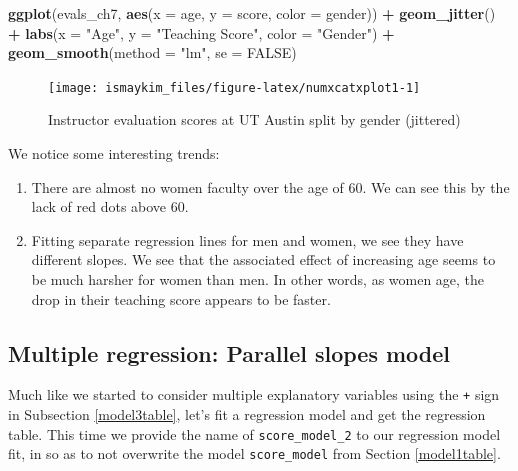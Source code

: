 \documentclass[12pt,]{krantz}
\makeatletter
\newenvironment{Shaded}{\begin{snugshade}}{\end{snugshade}}
\newcommand{\KeywordTok}[1]{\textcolor[rgb]{0.27,0.27,0.27}{\textbf{#1}}}
\newcommand{\DataTypeTok}[1]{\textcolor[rgb]{0.27,0.27,0.27}{#1}}
\newcommand{\StringTok}[1]{\textcolor[rgb]{0.5,0.5,0.5}{#1}}
\newcommand{\OtherTok}[1]{\textcolor[rgb]{0.37,0.37,0.37}{#1}}
\newcommand{\OperatorTok}[1]{\textcolor[rgb]{0.43,0.43,0.43}{\textbf{#1}}}
\newcommand{\NormalTok}[1]{#1}
\providecommand{\tightlist}{%
  \setlength{\itemsep}{0pt}\setlength{\parskip}{0pt}}
\newenvironment{kframe}{%
\medskip{}
\setlength{\fboxsep}{.8em}
 \def\at@end@of@kframe{}%
 \ifinner\ifhmode%
  \def\at@end@of@kframe{\end{minipage}}%
  \begin{minipage}{\columnwidth}%
 \fi\fi%
 \def\FrameCommand##1{\hskip\@totalleftmargin \hskip-\fboxsep
 \colorbox{shadecolor}{##1}\hskip-\fboxsep
     \hskip-\linewidth \hskip-\@totalleftmargin \hskip\columnwidth}%
 \MakeFramed {\advance\hsize-\width
   \@totalleftmargin\z@ \linewidth\hsize
   \@setminipage}}%
 {\par\unskip\endMakeFramed%
 \at@end@of@kframe}
\renewenvironment{Shaded}{\begin{kframe}}{\end{kframe}}
\theoremstyle{definition}
\theoremstyle{definition}
\theoremstyle{definition}
\theoremstyle{remark}
\makeatother
\begin{document}
\begin{Shaded}
\begin{Highlighting}[]
\KeywordTok{ggplot}\NormalTok{(evals_ch7, }\KeywordTok{aes}\NormalTok{(}\DataTypeTok{x =}\NormalTok{ age, }\DataTypeTok{y =}\NormalTok{ score, }\DataTypeTok{color =}\NormalTok{ gender)) }\OperatorTok{+}
\StringTok{  }\KeywordTok{geom_jitter}\NormalTok{() }\OperatorTok{+}
\StringTok{  }\KeywordTok{labs}\NormalTok{(}\DataTypeTok{x =} \StringTok{"Age"}\NormalTok{, }\DataTypeTok{y =} \StringTok{"Teaching Score"}\NormalTok{, }\DataTypeTok{color =} \StringTok{"Gender"}\NormalTok{) }\OperatorTok{+}
\StringTok{  }\KeywordTok{geom_smooth}\NormalTok{(}\DataTypeTok{method =} \StringTok{"lm"}\NormalTok{, }\DataTypeTok{se =} \OtherTok{FALSE}\NormalTok{)}
\end{Highlighting}
\end{Shaded}

\begin{figure}

{\centering \texttt{[image: ismaykim\_files/figure-latex/numxcatxplot1-1]} 

}

\caption{Instructor evaluation scores at UT Austin split by gender (jittered)}\label{fig:numxcatxplot1}
\end{figure}

We notice some interesting trends:

\begin{enumerate}
\def\labelenumi{\arabic{enumi}.}
\tightlist
\item
  There are almost no women faculty over the age of 60. We can see this
  by the lack of red dots above 60.
\item
  Fitting separate regression lines for men and women, we see they have
  different slopes. We see that the associated effect of increasing age
  seems to be much harsher for women than men. In other words, as women
  age, the drop in their teaching score appears to be faster.
\end{enumerate}

\subsection{Multiple regression: Parallel slopes
model}\label{model4table}

Much like we started to consider multiple explanatory variables using
the \texttt{+} sign in Subsection \ref{model3table}, let's fit a
regression model and get the regression table. This time we provide the
name of \texttt{score\_model\_2} to our regression model fit, in so as
to not overwrite the model \texttt{score\_model} from Section
\ref{model1table}.
\end{document}
